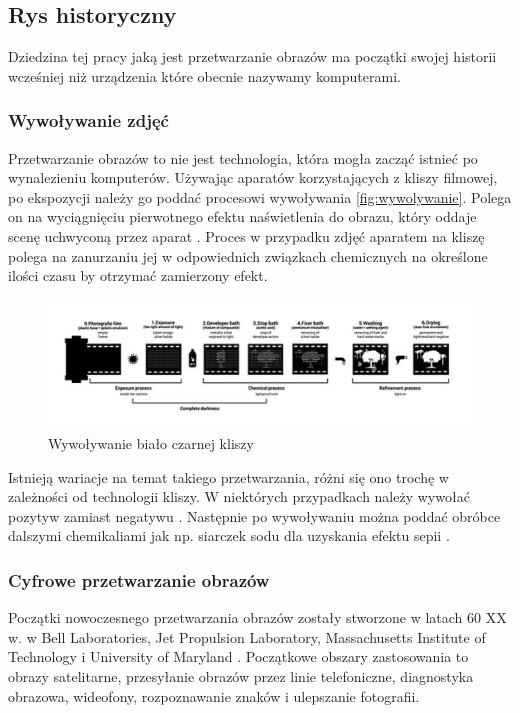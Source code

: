 \subsection{Rys historyczny}

Dziedzina tej pracy jaką jest przetwarzanie obrazów ma początki swojej historii wcześniej niż urządzenia które obecnie nazywamy komputerami.

\subsubsection{Wywoływanie zdjęć}
Przetwarzanie obrazów to nie jest technologia, która mogła zacząć istnieć po wynalezieniu komputerów. Używając aparatów korzystających z kliszy filmowej, po ekspozycji należy go poddać procesowi wywoływania \autoref{fig:wywolywanie}. Polega on na wyciągnięciu pierwotnego efektu naświetlenia do obrazu, który oddaje scenę uchwyconą przez aparat \cite{doi:https://doi.org/10.1002/14356007.a20_001}. Proces w przypadku zdjęć aparatem na kliszę polega na zanurzaniu jej w odpowiednich związkach chemicznych na określone ilości czasu by otrzymać zamierzony efekt. 

\begin{figure}[H]
    \centering
    \includegraphics{./images/Picture1.jpg}
    \caption{Wywoływanie biało czarnej kliszy}
    \label{fig:wywolywanie}
\end{figure}


Istnieją wariacje na temat takiego przetwarzania, różni się ono trochę w zależności od technologii kliszy. W niektórych przypadkach należy wywołać pozytyw zamiast negatywu \cite{almanac}. Następnie po wywoływaniu można poddać obróbce dalszymi chemikaliami jak np. siarczek sodu dla uzyskania efektu sepii \cite{sepia}. 

\subsubsection{Cyfrowe przetwarzanie obrazów}
Początki nowoczesnego przetwarzania obrazów zostały stworzone w latach 60 XX w. w Bell Laboratories, Jet Propulsion Laboratory, Massachusetts Institute of Technology i University of Maryland \cite{computerProcessing}. Początkowe obszary zastosowania to obrazy satelitarne, przesyłanie obrazów przez linie telefoniczne, diagnostyka obrazowa, wideofony, rozpoznawanie znaków i ulepszanie fotografii. 

